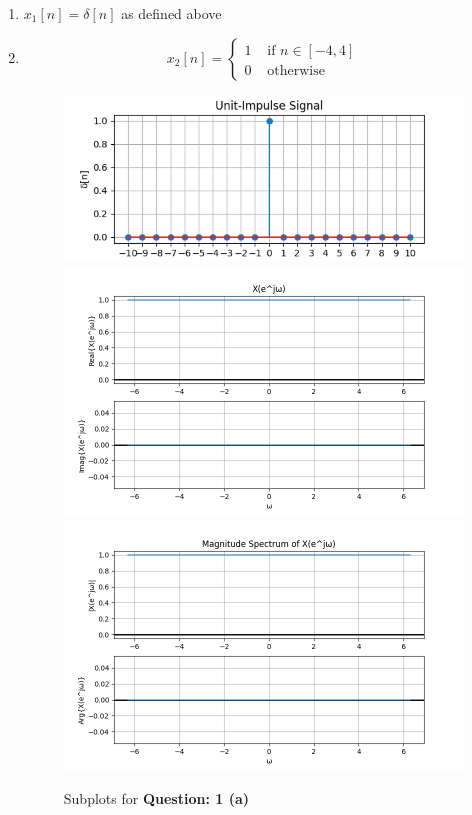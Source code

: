 \documentclass{article}
\begin{document}
    \begin{enumerate}[label=(\alph*)]

        \item $x_1[n] = \delta[n]$ as defined above

        \item \begin{equation}
            x_2[n] = \begin{cases}
                1 & \text{ if } n \in [-4, 4] \\
                0 & \text{ otherwise }
            \end{cases}
        \end{equation}

        \begin{figure}
            \centering
            \includegraphics[scale=0.925]{./Assets/solution-1a-1.png}
            \includegraphics[scale=0.7]{./Assets/solution-1a-2.png}
            \includegraphics[scale=0.7]{./Assets/solution-1a-3.png}
            \caption*{Subplots for \textbf{Question: 1 (a)}}
        \end{figure}


\end{enumerate}
\end{document}
